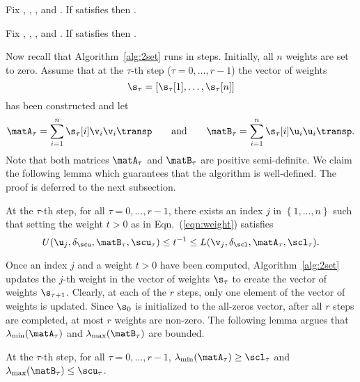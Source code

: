 \begin{lemma}
\label{lemma:sp1}
Fix , , , and . If  satisfies
then .
\end{lemma}

\begin{lemma}
\label{lemma:sp2}
Fix , , , and
. If  satisfies
then .
\end{lemma}

Now recall that Algorithm~\ref{alg:2set} runs in  steps. Initially, all $n$ weights are set to zero. Assume that at the $\tau$-th step ($\tau = 0,\ldots,r-1$) the vector of weights 
$$\s_{\tau} =
\left[\s_{\tau}[1],\ldots, \s_{\tau}[n]\right]$$ has been constructed and let
$$\matA_\tau=\sum_{i=1}^n \s_{\tau}[i]\v_i\v_i\transp
\qquad \mbox{and} \qquad \matB_\tau=\sum_{i=1}^n\s_{\tau}[i]\u_i\u_i\transp.$$
Note that both matrices $\matA_\tau$ and $\matB_\tau$ are positive
semi-definite. We claim the following lemma
which guarantees that the algorithm is well-defined.
The proof is deferred to the next subsection.
\begin{lemma}
\label{lemma:feasible}
At the $\tau$-th step, for all $\tau=0,\ldots,r-1$, there exists an index $j$ in $\left\{1,\ldots,n\right\}$ such that setting the weight $t > 0$ as in Eqn.~(\ref{eqn:weight}) satisfies
\begin{equation}\label{eqn:PD5}
U(\u_j,\delta_\scu,\matB_\tau,\scu_\tau) \le t^{-1} \le L(\v_j,\delta_\scl,\matA_\tau,\scl_\tau).
\end{equation}
\end{lemma}

Once an index $j$ and a weight $t>0$ have been computed, Algorithm~\ref{alg:2set} updates the $j$-th weight in the vector of weights $\s_{\tau}$ to create the vector of weights $\s_{\tau+1}$. Clearly, at each of the $r$ steps, only one element of the vector of weights is updated. Since $\s_0$ is initialized to the all-zeros vector, after all $r$ steps are completed, at most $r$ weights are non-zero. The following lemma argues that $\lambda_{\min}(\matA_\tau)$ and $\lambda_{\max}(\matB_\tau)$ are bounded.
\begin{lemma}
\label{lemma:bounds}
At the $\tau$-th step, for all $\tau=0,\ldots,r-1$, $\lambda_{\min}(\matA_\tau)\ge\scl_\tau$ and
$\lambda_{\max}(\matB_\tau)\le \scu_\tau$.
\end{lemma}


